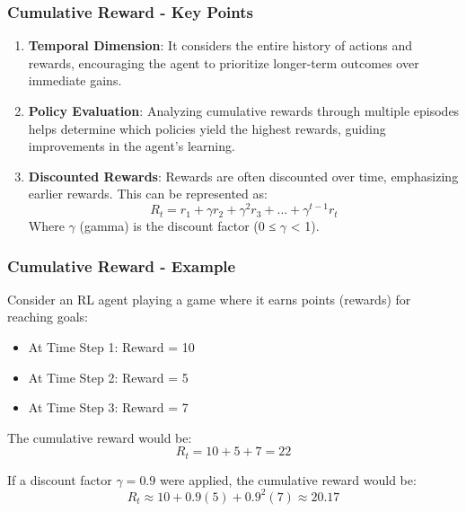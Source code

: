 \documentclass{beamer}
\begin{document}
\begin{frame}[fragile]
    \frametitle{Cumulative Reward - Key Points}
    \begin{enumerate}
        \item \textbf{Temporal Dimension}: It considers the entire history of actions and rewards, encouraging the agent to prioritize longer-term outcomes over immediate gains.
        \item \textbf{Policy Evaluation}: Analyzing cumulative rewards through multiple episodes helps determine which policies yield the highest rewards, guiding improvements in the agent's learning.
        \item \textbf{Discounted Rewards}: Rewards are often discounted over time, emphasizing earlier rewards. This can be represented as:
        \begin{equation}
            R_t = r_1 + \gamma r_2 + \gamma^2 r_3 + ... + \gamma^{t-1} r_t
        \end{equation}
        Where $\gamma$ (gamma) is the discount factor (0 ≤ $\gamma$ < 1).
    \end{enumerate}
\end{frame}

\begin{frame}[fragile]
    \frametitle{Cumulative Reward - Example}
    Consider an RL agent playing a game where it earns points (rewards) for reaching goals:
    
    \begin{itemize}
        \item At Time Step 1: Reward = 10
        \item At Time Step 2: Reward = 5
        \item At Time Step 3: Reward = 7
    \end{itemize}

    The cumulative reward would be:
    \begin{equation}
        R_t = 10 + 5 + 7 = 22
    \end{equation}

    If a discount factor $\gamma = 0.9$ were applied, the cumulative reward would be:
    \begin{equation}
        R_t \approx 10 + 0.9(5) + 0.9^2(7) \approx 20.17
    \end{equation}
\end{frame}
\end{document}
